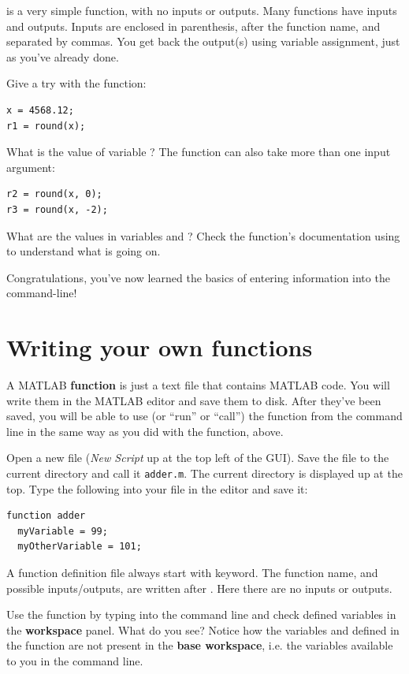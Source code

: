 \documentclass{article}
\begin{document}
 is a very simple function, with no inputs or outputs.
Many functions have inputs and outputs.
Inputs are enclosed in parenthesis, after the function name, and separated by commas.
You get back the output(s) using variable assignment, just as you've already done.

Give a try with the  function:
\begin{lstlisting}
x = 4568.12;
r1 = round(x);
\end{lstlisting}
What is the value of variable ? The  function can also take more than one input argument:
\begin{lstlisting}
r2 = round(x, 0);
r3 = round(x, -2);
\end{lstlisting}
What are the values in variables  and ?
Check the function's documentation using  to understand what is going on.

Congratulations, you've now learned the basics of entering information into the command-line!


\section{Writing your own functions}

A MATLAB \textbf{function} is just a text file that contains MATLAB code.
You will write them in the MATLAB editor and save them to disk.
After they've been saved, you will be able to use (or ``run'' or ``call'') the function from the command line in the same way as you did with the  function, above.

Open a new file (\emph{New Script} up at the top left of the GUI).
Save the file to the current directory and call it \verb|adder.m|.
The current directory is displayed up at the top.
Type the following into your file in the editor and save it:
\begin{lstlisting}
function adder
  myVariable = 99;
  myOtherVariable = 101;
\end{lstlisting}
A function definition file always start with  keyword.
The function name, and possible inputs/outputs, are written after .
Here there are no inputs or outputs.

Use the function by typing  into the command line and check defined variables in the \textbf{workspace} panel. What do you see?
Notice how the variables  and  defined in the  function are not present in the \textbf{base workspace}, i.e. the variables available to you in the command line.
\end{document}
